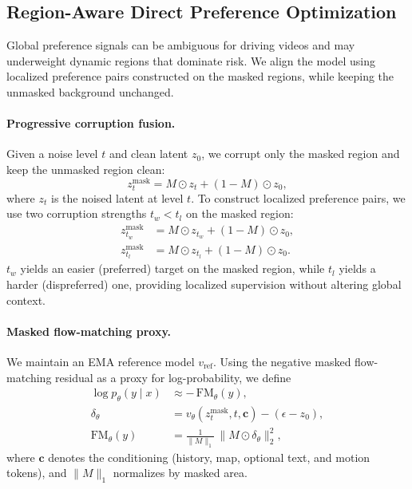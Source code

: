 \documentclass{article}
\begin{document}

\subsection{Region-Aware Direct Preference Optimization}
\label{subsec:ra_dpo}

Global preference signals can be ambiguous for driving videos and may underweight dynamic regions that dominate risk. We align the model using localized preference pairs constructed on the masked regions, while keeping the unmasked background unchanged.

\paragraph{Progressive corruption fusion.}
Given a noise level $t$ and clean latent $z_0$, we corrupt only the masked region and keep the unmasked region clean:
\begin{equation}
\label{eq:masked_latent}
z_t^{\mathrm{mask}} = M \odot z_t + (1-M)\odot z_0,
\end{equation}
where $z_t$ is the noised latent at level $t$. To construct localized preference pairs, we use two corruption strengths $t_w < t_l$ on the masked region:
\begin{equation}
\label{eq:progressive_pair}
\begin{aligned}
z_{t_w}^{\mathrm{mask}} &= M \odot z_{t_w} + (1-M)\odot z_0, \\
z_{t_l}^{\mathrm{mask}} &= M \odot z_{t_l} + (1-M)\odot z_0.
\end{aligned}
\end{equation}
$t_w$ yields an easier (preferred) target on the masked region, while $t_l$ yields a harder (dispreferred) one, providing localized supervision without altering global context.

\paragraph{Masked flow-matching proxy.}
We maintain an EMA reference model $v_{\mathrm{ref}}$. Using the negative masked flow-matching residual as a proxy for log-probability, we define
\begin{equation}
\label{eq:masked_fm_proxy}
\begin{aligned}
\log p_\theta(y \mid x) &\approx -\, \mathrm{FM}_\theta(y), \\
\delta_\theta &=
v_\theta(z_t^{\mathrm{mask}}, t, \mathbf{c}) - (\epsilon - z_0), \\
\mathrm{FM}_\theta(y)
&= \frac{1}{\lVert M\rVert_{1}}\,
\big\lVert M \odot \delta_\theta \big\rVert_2^{2},
\end{aligned}
\end{equation}
where $\mathbf{c}$ denotes the conditioning (history, map, optional text, and motion tokens), and $\lVert M\rVert_1$ normalizes by masked area.
\end{document}
